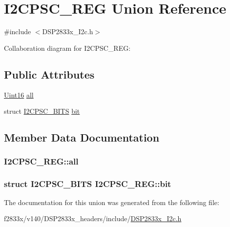 \hypertarget{union_i2_c_p_s_c___r_e_g}{}\section{I2\+C\+P\+S\+C\+\_\+\+R\+E\+G Union Reference}
\label{union_i2_c_p_s_c___r_e_g}


{\ttfamily \#include $<$D\+S\+P2833x\+\_\+\+I2c.\+h$>$}



Collaboration diagram for I2\+C\+P\+S\+C\+\_\+\+R\+E\+G\+:
\subsection*{Public Attributes}
\begin{DoxyCompactItemize}
\item 
\hyperlink{_d_s_p2833x___device_8h_a59a9f6be4562c327cbfb4f7e8e18f08b}{Uint16} \hyperlink{union_i2_c_p_s_c___r_e_g_a3abae0eb15f2a2964eccaea90fed2d11}{all}
\item 
struct \hyperlink{struct_i2_c_p_s_c___b_i_t_s}{I2\+C\+P\+S\+C\+\_\+\+B\+I\+T\+S} \hyperlink{union_i2_c_p_s_c___r_e_g_ac007d57365b350efc370393c27841370}{bit}
\end{DoxyCompactItemize}


\subsection{Member Data Documentation}
\hypertarget{union_i2_c_p_s_c___r_e_g_a3abae0eb15f2a2964eccaea90fed2d11}{}
\subsubsection[{all}]{ I2\+C\+P\+S\+C\+\_\+\+R\+E\+G\+::all}\label{union_i2_c_p_s_c___r_e_g_a3abae0eb15f2a2964eccaea90fed2d11}
\hypertarget{union_i2_c_p_s_c___r_e_g_ac007d57365b350efc370393c27841370}{}
\subsubsection[{bit}]{\setlength{\rightskip}{0pt plus 5cm}struct {\bf I2\+C\+P\+S\+C\+\_\+\+B\+I\+T\+S} I2\+C\+P\+S\+C\+\_\+\+R\+E\+G\+::bit}\label{union_i2_c_p_s_c___r_e_g_ac007d57365b350efc370393c27841370}


The documentation for this union was generated from the following file\+:\begin{DoxyCompactItemize}
\item 
f2833x/v140/\+D\+S\+P2833x\+\_\+headers/include/\hyperlink{_d_s_p2833x___i2c_8h}{D\+S\+P2833x\+\_\+\+I2c.\+h}\end{DoxyCompactItemize}
